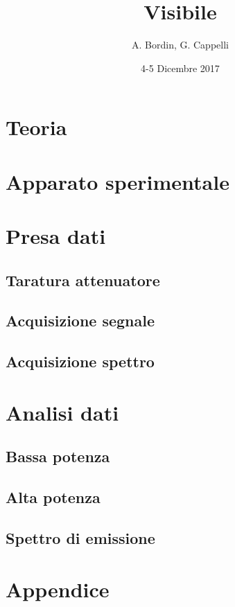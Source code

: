 \documentclass[a4paper]{article}
\author{A. Bordin, G. Cappelli}
\title{Visibile}
\date{4-5 Dicembre 2017}
\begin{document}
	\maketitle
	
	\begin{abstract}
		 
	\end{abstract}
	
\section{Teoria}

\section{Apparato sperimentale}

\section{Presa dati}

\subsection{Taratura attenuatore}

\subsection{Acquisizione segnale}

\subsection{Acquisizione spettro}

\section{Analisi dati}

\subsection{Bassa potenza}

\subsection{Alta potenza}

\subsection{Spettro di emissione}

\newpage
\section*{Appendice}
	
\end{document}
